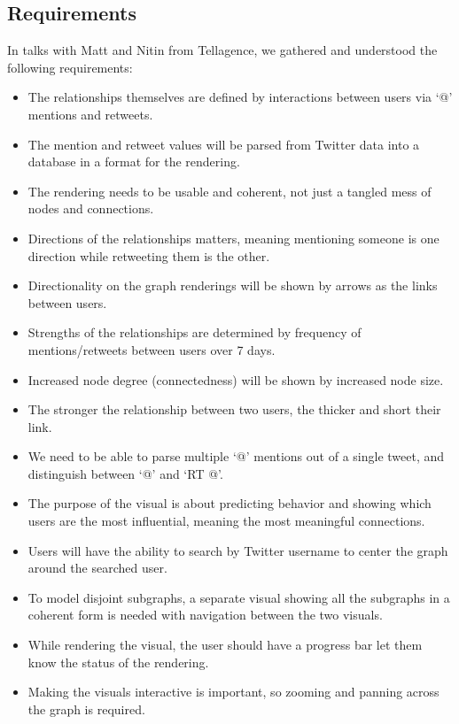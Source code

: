 \documentclass[12pt, letterpaper]{article}
\begin{document}
  \subsection{Requirements}
	In talks with Matt and Nitin from Tellagence, we gathered and understood the following requirements:
	\begin{itemize}
		\item The relationships themselves are defined by interactions between users via `@' mentions and retweets.
		\item The mention and retweet values will be parsed from Twitter data into a database in a format for the rendering.
		\item The rendering needs to be usable and coherent, not just a tangled mess of nodes and connections.
		\item Directions of the relationships matters, meaning mentioning someone is one direction while retweeting them is the other.
        \item Directionality on the graph renderings will be shown by arrows as the links between users.
		\item Strengths of the relationships are determined by frequency of mentions/retweets between users over 7 days.
        \item Increased node degree (connectedness) will be shown by increased node size.
        \item The stronger the relationship between two users, the thicker and short their link.
		\item We need to be able to parse multiple `@' mentions out of a single tweet, and distinguish between `@' and `RT @'.
		\item The purpose of the visual is about predicting behavior and showing which users are the most influential, meaning the most meaningful connections.
        \item Users will have the ability to search by Twitter username to center the graph around the searched user.
        \item To model disjoint subgraphs, a separate visual showing all the subgraphs in a coherent form is needed with navigation between the two visuals.
        \item While rendering the visual, the user should have a progress bar let them know the status of the rendering.
        \item Making the visuals interactive is important, so zooming and panning across the graph is required.
	\end{itemize}
\end{document}
